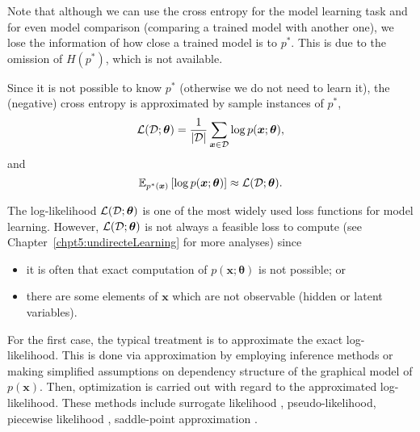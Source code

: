 Note that although we can use the cross entropy for the model learning task and for even model comparison (comparing a trained model with another one), we lose the information of how close a trained model is to $p^{\ast}$. This is due to the omission of $H(p^{\ast})$, which is not available.

Since it is not possible to know $p^{\ast}$ (otherwise we do not need to learn it), the (negative) cross entropy is approximated by sample instances of $p^{\ast}$,
\begin{equation}
  \mathcal{L}(\mathcal{D}; \bm{\theta}) = \frac{1}{| \mathcal{D} |}\sum_{\bm{x}\in \mathcal{D}}\log{p(\bm{x};\bm{\theta})},
\end{equation}
and
\begin{equation}
  \mathbb{E}_{p^{\ast}(\bm{x})}\left[ \log{{p(\bm{x}; \bm{\theta})}} \right] \approx \mathcal{L}(\mathcal{D}; \bm{\theta}).
\end{equation}


The log-likelihood $\mathcal{L}(\mathcal{D}; \bm{\theta})$ is one of the most widely used loss functions for model learning. However, $\mathcal{L}(\mathcal{D}; \bm{\theta})$ is not always a feasible loss to compute (see Chapter~\ref{chpt5:undirecteLearning} for more analyses) since
\begin{itemize}
\item it is often that exact computation of $p(\bm{x};\bm{\theta})$ is not possible; or
\item there are some elements of $\bm{x}$ which are not observable (hidden or latent variables).
\end{itemize}
For the first case, the typical treatment is to approximate the exact log-likelihood. This is done via approximation by employing inference methods or   making simplified assumptions on dependency structure of the graphical model of $p(\bm{x})$. Then, optimization is carried out with regard to the approximated log-likelihood. These methods include surrogate likelihood \cite{wainwright06estimating, lu2019blockBP}, pseudo-likelihood\cite{qu2019gmnn, lazarogredilla2019learning}, piecewise likelihood \cite{sutton2012piecewise, lin_2016_CVPR}, saddle-point approximation \cite{srikumar-etal-2012-amortizing, NIPS2019_9687}.

